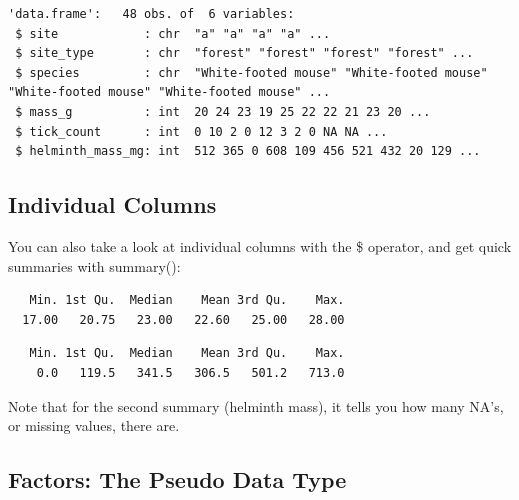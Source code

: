 \documentclass[
  letterpaper,
  DIV=11,
  numbers=noendperiod]{scrreprt}
\newenvironment{Shaded}{\begin{snugshade}}{\end{snugshade}}
\newcommand{\DocumentationTok}[1]{\textcolor[rgb]{0.37,0.37,0.37}{\textit{#1}}}
\newcommand{\FunctionTok}[1]{\textcolor[rgb]{0.28,0.35,0.67}{#1}}
\newcommand{\NormalTok}[1]{\textcolor[rgb]{0.00,0.23,0.31}{#1}}
\newcommand{\SpecialCharTok}[1]{\textcolor[rgb]{0.37,0.37,0.37}{#1}}
\begin{document}
\begin{verbatim}
'data.frame':   48 obs. of  6 variables:
 $ site            : chr  "a" "a" "a" "a" ...
 $ site_type       : chr  "forest" "forest" "forest" "forest" ...
 $ species         : chr  "White-footed mouse" "White-footed mouse" "White-footed mouse" "White-footed mouse" ...
 $ mass_g          : int  20 24 23 19 25 22 22 21 23 20 ...
 $ tick_count      : int  0 10 2 0 12 3 2 0 NA NA ...
 $ helminth_mass_mg: int  512 365 0 608 109 456 521 432 20 129 ...
\end{verbatim}

\subsection{Individual Columns}\label{individual-columns}

You can also take a look at individual columns with the \$ operator, and
get quick summaries with summary():

\begin{Shaded}
\end{Shaded}

\begin{verbatim}
   Min. 1st Qu.  Median    Mean 3rd Qu.    Max. 
  17.00   20.75   23.00   22.60   25.00   28.00 
\end{verbatim}

\begin{Shaded}
\end{Shaded}

\begin{verbatim}
   Min. 1st Qu.  Median    Mean 3rd Qu.    Max. 
    0.0   119.5   341.5   306.5   501.2   713.0 
\end{verbatim}

Note that for the second summary (helminth mass), it tells you how many
NA's, or missing values, there are.

\subsection{Factors: The Pseudo Data Type}\label{sec-factors}
\end{document}
